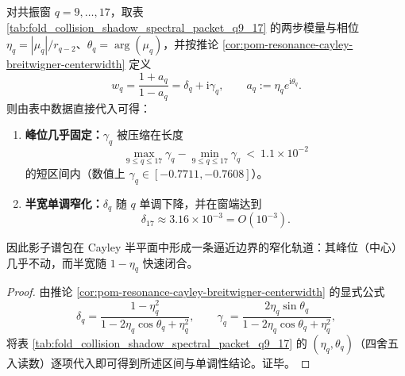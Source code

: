 \begin{corollary}\label{cor:pom-resonance-cayley-narrowing-orbit}
对共振窗 \(q=9,\dots,17\)，取表 \ref{tab:fold_collision_shadow_spectral_packet_q9_17} 的两步模量与相位
\(
\eta_q=|\mu_q|/r_{q-2}
\)、\(\theta_q=\arg(\mu_q)
\)，并按推论 \ref{cor:pom-resonance-cayley-breitwigner-centerwidth} 定义
\[
w_q=\frac{1+a_q}{1-a_q}=\delta_q+\mathrm{i}\gamma_q,
\qquad a_q:=\eta_q e^{\mathrm{i}\theta_q}.
\]
则由表中数据直接代入可得：
\begin{enumerate}
  \item \textbf{峰位几乎固定：}\(\gamma_q\) 被压缩在长度
  \[
  \max_{9\le q\le 17}\gamma_q-\min_{9\le q\le 17}\gamma_q\ <\ 1.1\times 10^{-2}
  \]
  的短区间内（数值上 \(\gamma_q\in[-0.7711,-0.7608]\)）。
  \item \textbf{半宽单调窄化：}\(\delta_q\) 随 \(q\) 单调下降，并在窗端达到
  \[
  \delta_{17}\approx 3.16\times 10^{-3}=O(10^{-3}).
  \]
\end{enumerate}
因此影子谱包在 Cayley 半平面中形成一条逼近边界的窄化轨道：其峰位（中心）几乎不动，而半宽随 \(1-\eta_q\) 快速闭合。
\end{corollary}
\begin{proof}
由推论 \ref{cor:pom-resonance-cayley-breitwigner-centerwidth} 的显式公式
\[
\delta_q=\frac{1-\eta_q^{2}}{1-2\eta_q\cos\theta_q+\eta_q^{2}},
\qquad
\gamma_q=\frac{2\eta_q\sin\theta_q}{1-2\eta_q\cos\theta_q+\eta_q^{2}},
\]
将表 \ref{tab:fold_collision_shadow_spectral_packet_q9_17} 的 \((\eta_q,\theta_q)\)（四舍五入读数）逐项代入即可得到所述区间与单调性结论。证毕。
\end{proof}

\endinput
